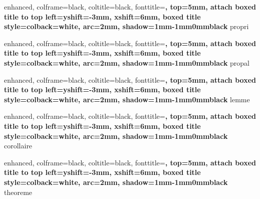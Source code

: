 


\newtheorem{_definition}{Définition}[section]
\newenvironment{definition}[1][]{
    \begin{tcolorbox}[
        sharp corners,
        colback=white,
        colframe=black,
        leftrule=1mm,
        toprule=-1mm, bottomrule=-1mm, rightrule=-1mm,
        top=0mm, left=1mm
    ]
    \begin{_definition}#1~\par
}{%
    \end{_definition}%
    \end{tcolorbox}
}

%
{
    enhanced,
    colframe=black,
    coltitle=black, fonttitle=\bfseries,
    top=5mm,
    attach boxed title to top left={yshift=-3mm, xshift=6mm},
    boxed title style={colback=white, arc=2mm, shadow={1mm}{-1mm}{0mm}{black}}
}{propri}

%
{
    enhanced,
    colframe=black,
    coltitle=black, fonttitle=\bfseries,
    top=5mm,
    attach boxed title to top left={yshift=-3mm, xshift=6mm},
    boxed title style={colback=white, arc=2mm, shadow={1mm}{-1mm}{0mm}{black}}
}{propal}

%
{
    enhanced,
    colframe=black,
    coltitle=black, fonttitle=\bfseries,
    top=5mm,
    attach boxed title to top left={yshift=-3mm, xshift=6mm},
    boxed title style={colback=white, arc=2mm, shadow={1mm}{-1mm}{0mm}{black}}
}{lemme}

%
{
    enhanced,
    colframe=black,
    coltitle=black, fonttitle=\bfseries,
    top=5mm,
    attach boxed title to top left={yshift=-3mm, xshift=6mm},
    boxed title style={colback=white, arc=2mm, shadow={1mm}{-1mm}{0mm}{black}}
}{corollaire}

%
{
    enhanced,
    colframe=black,
    coltitle=black, fonttitle=\bfseries,
    top=5mm,
    attach boxed title to top left={yshift=-3mm, xshift=6mm},
    boxed title style={colback=white, arc=2mm, shadow={1mm}{-1mm}{0mm}{black}}
}{theoreme}

